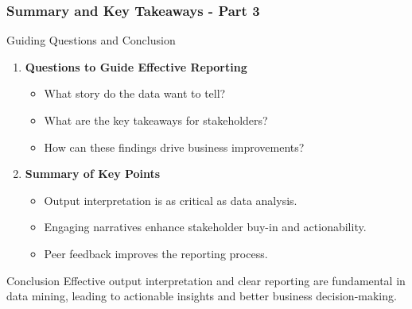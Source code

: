 \documentclass{beamer}
\begin{document}
\begin{frame}[fragile]
    \frametitle{Summary and Key Takeaways - Part 3}
    
    \begin{block}{Guiding Questions and Conclusion}
        \begin{enumerate}
            \item \textbf{Questions to Guide Effective Reporting}
            \begin{itemize}
                \item What story do the data want to tell?
                \item What are the key takeaways for stakeholders?
                \item How can these findings drive business improvements?
            \end{itemize}
            
            \item \textbf{Summary of Key Points}
            \begin{itemize}
                \item Output interpretation is as critical as data analysis.
                \item Engaging narratives enhance stakeholder buy-in and actionability.
                \item Peer feedback improves the reporting process.
            \end{itemize}
        \end{enumerate}
    \end{block}

    \begin{block}{Conclusion}
        \centering
        Effective output interpretation and clear reporting are fundamental in data mining, leading to actionable insights and better business decision-making.
    \end{block}
\end{frame}
\end{document}
